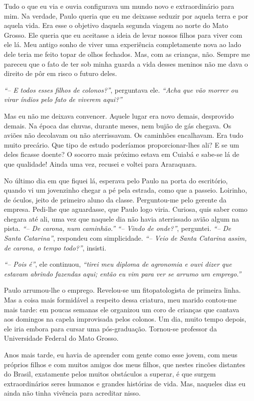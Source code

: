 Tudo o que eu via e ouvia configurava um mundo novo e extraordinário para mim.
Na verdade, Paulo queria que eu me deixasse seduzir por aquela terra e por aquela vida.
Era esse o objetivo daquela segunda viagem ao norte do Mato Grosso.
Ele queria que eu aceitasse a ideia de levar nossos filhos para viver com ele lá.
Meu antigo sonho de viver uma experiência completamente nova ao lado dele teria me feito topar de olhos fechados.
Mas, com as crianças, não.
Sempre me pareceu que o fato de ter sob minha guarda a vida desses meninos não me dava o direito de pôr em risco o futuro deles.

\textit{``-- E todos esses filhos de colonos?''}, perguntava ele.
\textit{``Acha que vão morrer ou virar índios pelo fato de viverem aqui?''} 

Mas eu não me deixava convencer.
Aquele lugar era novo demais, desprovido demais.
Na época das chuvas, durante meses, nem bujão de gás chegava.
Os aviões não decolavam ou não aterrissavam.
Os caminhões encalhavam.
Era tudo muito precário.
Que tipo de estudo poderíamos proporcionar-lhes ali? E se um deles ficasse doente? O socorro mais próximo estava em Cuiabá e sabe-se lá de que qualidade! Ainda uma vez, recusei e voltei para Araraquara.


No último dia em que fiquei lá, esperava pelo Paulo na porta do escritório, quando vi um jovenzinho chegar a pé pela estrada, como que a passeio.
Loirinho, de óculos, jeito de primeiro aluno da classe.
Perguntou-me pelo gerente da empresa.
Pedi-lhe que aguardasse, que Paulo logo viria.
Curiosa, quis saber como chegara até ali, uma vez que naquele dia não havia aterrissado avião algum na pista.
\textit{``-- De carona, num caminhão.''} 
\textit{``-- Vindo de onde?''}, perguntei.
 \textit{``-- De Santa Catarina''}, respondeu com simplicidade.
\textit{``-- Veio de Santa Catarina assim, de carona, o tempo todo?''}, insisti.
 
\textit{``-- Pois é''}, ele continuou, \textit{``tirei meu diploma de agronomia e ouvi dizer que estavam abrindo fazendas aqui; então eu vim para ver se arrumo um emprego.''}

Paulo arrumou-lhe o emprego.
Revelou-se um fitopatologista de primeira linha.
Mas a coisa mais formidável a respeito dessa criatura, meu marido contou-me mais tarde: em poucas semanas ele organizou um coro de crianças que cantava aos domingos na capela improvisada pelos colonos.
Um dia, muito tempo depois, ele iria embora para cursar uma pós-graduação.
Tornou-se professor da Universidade Federal do Mato Grosso.


Anos mais tarde, eu havia de aprender com gente como esse jovem, com meus próprios filhos e com muitos amigos dos meus filhos, que nestes rincões distantes do Brasil, exatamente pelos muitos obstáculos a superar, é que surgem extraordinários seres humanos e grandes histórias de vida.
 Mas, naqueles dias eu ainda não tinha vivência para acreditar nisso.

